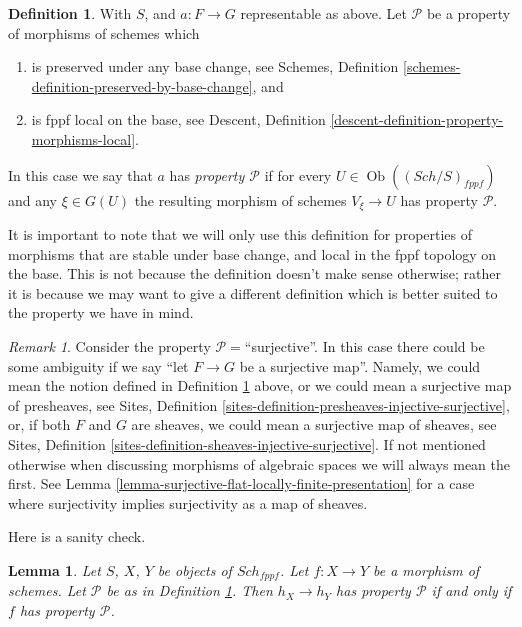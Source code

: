 \documentclass{stacks-project}
\theoremstyle{plain}
\newtheorem{lemma}[subsection]{Lemma}
\theoremstyle{definition}
\newtheorem{definition}[subsection]{Definition}
\theoremstyle{remark}
\newtheorem{remark}[subsection]{Remark}
\numberwithin{equation}{subsection}
\def\Sch{\mathit{Sch}}
\def\Ob{\mathop{\mathrm{Ob}}\nolimits}
\begin{document}
\begin{definition}
\label{definition-relative-representable-property}
With $S$, and $a : F \to G$ representable as above.
Let $\mathcal{P}$ be a property of morphisms of schemes which
\begin{enumerate}
\item is preserved under any base change,
see Schemes, Definition \ref{schemes-definition-preserved-by-base-change},
and
\item is fppf local on the base, see
Descent, Definition \ref{descent-definition-property-morphisms-local}.
\end{enumerate}
In this case we say that $a$ has {\it property $\mathcal{P}$} if for every
$U \in \Ob((\Sch/S)_{fppf})$ and
any $\xi \in G(U)$ the resulting morphism of schemes
$V_\xi \to U$ has property $\mathcal{P}$.
\end{definition}

\noindent
It is important to note that we will only use this definition for
properties of morphisms that are stable under base change, and
local in the fppf topology on the base. This is
not because the definition doesn't make sense otherwise; rather it
is because we may want to give a different definition which is
better suited to the property we have in mind.

\begin{remark}
\label{remark-warning}
Consider the property $\mathcal{P}=$``surjective''.
In this case there could be some ambiguity if we say
``let $F \to G$ be a surjective map''.
Namely, we could mean the notion defined
in Definition \ref{definition-relative-representable-property}
above, or we could mean a surjective map of presheaves, see
Sites, Definition \ref{sites-definition-presheaves-injective-surjective},
or, if both $F$ and $G$ are sheaves,
we could mean a surjective map of sheaves, see
Sites, Definition \ref{sites-definition-sheaves-injective-surjective}.
If not mentioned otherwise when discussing morphisms of algebraic spaces
we will always mean the first. See
Lemma \ref{lemma-surjective-flat-locally-finite-presentation}
for a case where surjectivity implies surjectivity as a map of sheaves.
\end{remark}

\noindent
Here is a sanity check.

\begin{lemma}
\label{lemma-morphism-schemes-gives-representable-transformation-property}
Let $S$, $X$, $Y$ be objects of $\Sch_{fppf}$.
Let $f : X \to Y$ be a morphism of schemes.
Let $\mathcal{P}$ be as in
Definition \ref{definition-relative-representable-property}.
Then $h_X \longrightarrow h_Y$ has property $\mathcal{P}$ if
and only if $f$ has property $\mathcal{P}$.
\end{lemma}
\end{document}
